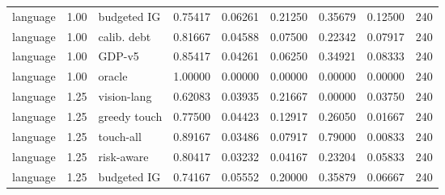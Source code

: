 \documentclass{article}
\begin{document}
\begin{center}
\begin{longtable}{lllllllll}
language & 1.00 & budgeted IG & 0.75417 & 0.06261 & 0.21250 & 0.35679 & 0.12500 & 240 \\
language & 1.00 & calib. debt & 0.81667 & 0.04588 & 0.07500 & 0.22342 & 0.07917 & 240 \\
language & 1.00 & GDP-v5 & 0.85417 & 0.04261 & 0.06250 & 0.34921 & 0.08333 & 240 \\
language & 1.00 & oracle & 1.00000 & 0.00000 & 0.00000 & 0.00000 & 0.00000 & 240 \\
language & 1.25 & vision-lang & 0.62083 & 0.03935 & 0.21667 & 0.00000 & 0.03750 & 240 \\
language & 1.25 & greedy touch & 0.77500 & 0.04423 & 0.12917 & 0.26050 & 0.01667 & 240 \\
language & 1.25 & touch-all & 0.89167 & 0.03486 & 0.07917 & 0.79000 & 0.00833 & 240 \\
language & 1.25 & risk-aware & 0.80417 & 0.03232 & 0.04167 & 0.23204 & 0.05833 & 240 \\
language & 1.25 & budgeted IG & 0.74167 & 0.05552 & 0.20000 & 0.35879 & 0.06667 & 240 \\
\bottomrule
\end{longtable}
\renewcommand{\arraystretch}{1.0}
\end{center}
\end{document}
